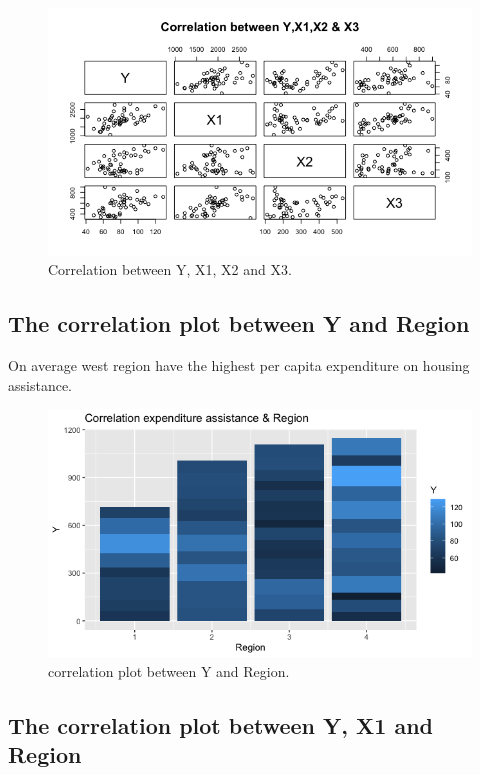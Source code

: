 \documentclass[12pt,letterpaper]{article}
\begin{document}
  
\vspace{.25cm}

\begin{figure}[h!]\centering
	\caption{\footnotesize Correlation between Y, X1, X2 and X3.}
	\label{fig:plot_1}
	\includegraphics[width=.75\textwidth]{Correlation_plot_expenditure.png}
\end{figure}

\newpage
\subsection*{The correlation plot between Y and Region}

On average west region have the highest per capita expenditure on housing assistance. 

  

\begin{figure}[h!]\centering
	\caption{\footnotesize correlation plot  between Y and Region.}
	\label{fig:plot_2}
	\includegraphics[width=.75\textwidth]{plot_Y+Region.png}
\end{figure}

\newpage

\subsection*{The correlation plot between Y, X1 and Region}
\end{document}
